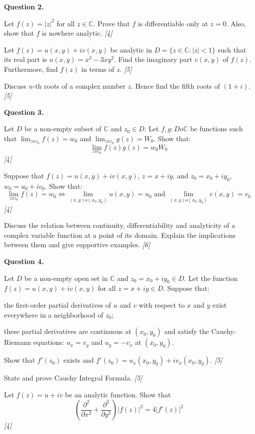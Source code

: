 \documentclass[11pt,a4paper]{article}
\newcommand{\pts}[1]{\hfill   \textit{[#1]}}
\begin{document}
\medskip


\noindent   \textbf{Question 2.}

\begin{parts}
  \item Let $f(z) = |z|^2$ for all $z \in \mathbb{C}$. Prove that $f$ is differentiable only at $z=0$. Also, show that $f$ is nowhere analytic. \pts{4}
  \item Let $f(z) = u(x,y) + iv(x,y)$ be analytic in $D = \{z \in \mathbb{C} : |z| < 1\}$ such that its real part is $u(x,y) = x^3 - 3xy^2$. Find the imaginary part $v(x,y)$ of $f(z)$. Furthermore, find $f(z)$ in terms of $z$. \pts{5}
  \item Discuss $n$-th roots of a complex number $z$. Hence find the fifth roots of $(1+i)$. \pts{5}
\end{parts}

\medskip


\noindent   \textbf{Question 3.}

\begin{parts}
  \item Let $D$ be a non-empty subset of $\mathbb{C}$ and $z_0 \in D$. Let $f, g : D  o \mathbb{C}$ be functions such that $\lim_{z  o z_0} f(z) = w_0$ and $\lim_{z  o z_0} g(z) = W_0$. Show that:
  \[ \lim_{z  o z_0} f(z)g(z) = w_0 W_0 \] \pts{4}
  \item Suppose that $f(z) = u(x,y) + iv(x,y)$, $z = x + iy$, and $z_0 = x_0 + iy_0$, $w_0 = u_0 + iv_0$. Show that:
  \[ \lim_{z  o z_0} f(z) = w_0 \iff \lim_{(x,y)  o (x_0,y_0)} u(x,y) = u_0  \text{ and } \lim_{(x,y)  o (x_0,y_0)} v(x,y) = v_0 \] \pts{4}
  \item Discuss the relation between continuity, differentiability and analyticity of a complex variable function at a point of its domain. Explain the implications between them and give supportive examples. \pts{6}
\end{parts}

\medskip


\noindent   \textbf{Question 4.}

\begin{parts}
  \item Let $D$ be a non-empty open set in $\mathbb{C}$ and $z_0 = x_0 + iy_0 \in D$. Let the function $f(z) = u(x,y) + iv(x,y)$ for all $z = x+iy \in D$. Suppose that:
  
\begin{parts}
    \item the first-order partial derivatives of $u$ and $v$ with respect to $x$ and $y$ exist everywhere in a neighborhood of $z_0$;
    \item these partial derivatives are continuous at $(x_0, y_0)$ and satisfy the Cauchy-Riemann equations: $u_x = v_y$ and $u_y = -v_x$ at $(x_0, y_0)$.
  \end{parts}
  Show that $f'(z_0)$ exists and $f'(z_0) = u_x(x_0, y_0) + i v_x(x_0, y_0)$. \pts{5}
  \item State and prove Cauchy Integral Formula. \pts{5}
  \item Let $f(z) = u + iv$ be an analytic function. Show that
  \[ \left( \frac{\partial^2}{\partial x^2} + \frac{\partial^2}{\partial y^2} \right) |f(z)|^2 = 4 |f'(z)|^2 \] \pts{4}
\end{parts}
\end{document}
